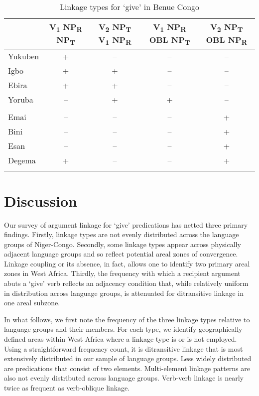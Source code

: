 \documentclass[output=paper,colorlinks,citecolor=brown]{langscibook}
\begin{document}
\begin{table}
\small
\caption{Linkage types for ‘give’ in Benue Congo}
\label{tab:LinkageBC}
 \begin{tabular}{lcccc}
  \lsptoprule
 &  V\textsubscript{1} NP\textsubscript{R} NP\textsubscript{T}
 & V\textsubscript{2} NP\textsubscript{T} V\textsubscript{1} NP\textsubscript{R}
 & V\textsubscript{1} NP\textsubscript{R} OBL NP\textsubscript{T}
 & V\textsubscript{2} NP\textsubscript{T} OBL NP\textsubscript{R}  \\
\midrule
Yukuben & +& -- &-- &-- \\
Igbo &+& +&--&-- \\
Ebira&+ &+& --& -- \\
Yoruba& -- &+& + &-- \\
&&&& \\
Emai& -- &-- &--& + \\
Bini& -- &-- &--& + \\
Esan& -- &--& --&+ \\
Degema &+& --& --& + \\
  \lspbottomrule
 \end{tabular}
\end{table}


\section{Discussion}\label{sec:8:4}

Our survey of argument linkage for ‘give’ predications has netted three primary findings. Firstly, linkage types are not evenly distributed across the language groups of Niger-Congo. Secondly, some linkage types appear across physically adjacent language groups and so reflect potential areal zones of convergence. Linkage coupling or its absence, in fact, allows one to identify two primary areal zones in West Africa. Thirdly, the frequency with which a recipient argument abuts a ‘give’ verb reflects an adjacency condition that, while relatively uniform in distribution across language groups, is attenuated for ditransitive linkage in one areal subzone.

In what follows, we first note the frequency of the three linkage types relative to language groups and their members. For each type, we identify geographically  defined areas within West Africa where a linkage type is or is not employed. Using a straightforward frequency count, it is ditransitive linkage that is most extensively distributed in our sample of language groups. Less widely distributed are predications that consist of two elements. Multi-element linkage patterns are also not evenly distributed across language groups. Verb-verb linkage is nearly twice as frequent as verb-oblique linkage.
\end{document}

